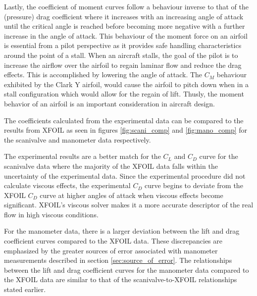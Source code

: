 \documentclass[runningheads]{llncs}
\begin{document}
\noindent
Lastly, the coefficient of moment curves follow a behaviour inverse to that of the (pressure) drag coefficient where it increases with an increasing angle of attack until the critical angle is reached before becoming more negative with a further increase in the angle of attack. This behaviour of the moment force on an airfoil is essential from a pilot perspective as it provides safe handling characteristics around the point of a stall. When an aircraft stalls, the goal of the pilot is to increase the airflow over the airfoil to regain laminar flow and reduce the drag effects. This is accomplished by lowering the angle of attack. The $C_M$ behaviour exhibited by the Clark Y airfoil, would cause the airfoil to pitch down when in a stall configuration which would allow for the regain of lift. Thusly, the moment behavior of an airfoil is an important consideration in aircraft design.\newline

\noindent
The coefficients calculated from the experimental data can be compared to the results from XFOIL as seen in figures \ref{fig:scani_comp} and \ref{fig:mano_comp} for the scanivalve and manometer data respectively.\newline

\noindent
The experimental results are a better match for the $C_L$ and $C_D$ curve for the scanivalve data where the majority of the XFOIL data falls within the uncertainty of the experimental data. Since the experimental procedure did not calculate viscous effects, the experimental $C_D$ curve begins to deviate from the XFOIL $C_D$ curve at higher angles of attack when viscous effects become significant. XFOIL's viscous solver makes it a more accurate descriptor of the real flow in high viscous conditions. \newline

\noindent
For the manometer data, there is a larger deviation between the lift and drag coefficient curves compared to the XFOIL data. These discrepancies are emphasized by the greater sources of error associated with manometer measurements described in section \ref{sec:source_of_error}. The relationships between the lift and drag coefficient curves for the manometer data compared to the XFOIL data are similar to that of the scanivalve-to-XFOIL relationships stated earlier.
\end{document}
